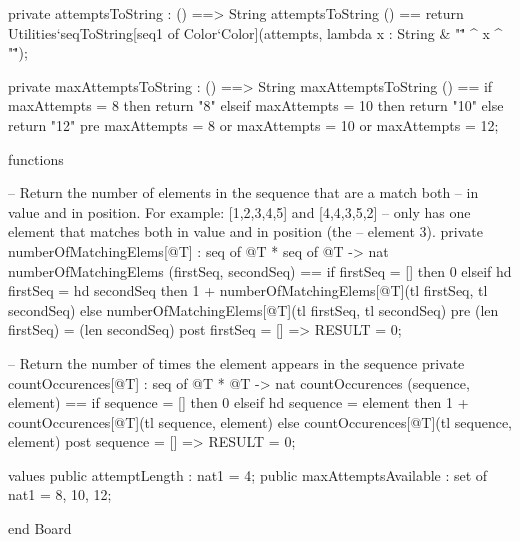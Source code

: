 \begin{vdm_al}
  private attemptsToString : () ==> String
  attemptsToString () ==
   return Utilities`seqToString[seq1 of Color`Color](attempts,
    lambda x : String & "\"" ^ x ^ "\"");

  private maxAttemptsToString : () ==> String
  maxAttemptsToString () ==
   if maxAttempts = 8 then return "8"
   elseif maxAttempts = 10 then return "10"
   else return "12"
  pre maxAttempts = 8 or maxAttempts = 10 or maxAttempts = 12;


 functions

  -- Return the number of elements in the sequence that are a match both
  -- in value and in position. For example: [1,2,3,4,5] and [4,4,3,5,2]
  -- only has one element that matches both in value and in position (the
  -- element 3).
  private numberOfMatchingElems[@T] : seq of @T * seq of @T -> nat
   numberOfMatchingElems (firstSeq, secondSeq) ==
    if firstSeq = [] then
     0
    elseif hd firstSeq = hd secondSeq then
     1 + numberOfMatchingElems[@T](tl firstSeq, tl secondSeq)
    else
     numberOfMatchingElems[@T](tl firstSeq, tl secondSeq)
   pre (len firstSeq) = (len secondSeq)
   post firstSeq = [] => RESULT = 0;

  -- Return the number of times the element appears in the sequence
  private countOccurences[@T] : seq of @T * @T -> nat
   countOccurences (sequence, element) ==
    if sequence = [] then
     0
    elseif hd sequence = element then
     1 + countOccurences[@T](tl sequence, element)
    else
     countOccurences[@T](tl sequence, element)
   post sequence = [] => RESULT = 0;


 values
  public attemptLength : nat1 = 4;
  public maxAttemptsAvailable : set of nat1 = {8, 10, 12};

end Board
\end{vdm_al}
\bigskip
